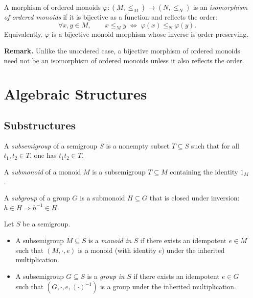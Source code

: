 \begin{definition}
\label{def:ordered-monoid-isomorphism}
A morphism of ordered monoids \(\varphi:(M,\le_M)\to (N,\le_N)\) is an \emph{isomorphism of ordered monoids} if it is bijective as a function and reflects the order:
\[
\forall x,y\in M,\qquad x\le_M y \;\Longleftrightarrow\; \varphi(x)\le_N \varphi(y).
\]
Equivalently, \(\varphi\) is a bijective monoid morphism whose inverse is order-preserving.
\end{definition}

\noindent\textbf{Remark.}
Unlike the unordered case, a bijective morphism of ordered monoids need not be an isomorphism of ordered monoids unless it also reflects the order.

\chapter {Algebraic Structures}

\section{Substructures}

\begin{definition}[Subsemigroup]
\label{def:subsemigroup}
A \emph{subsemigroup} of a semigroup \(S\) is a nonempty subset \(T\subseteq S\) such that for all \(t_1,t_2\in T\), one has \(t_1t_2\in T\).
\end{definition}

\begin{definition}
\label{def:submonoid}
A \emph{submonoid} of a monoid \(M\) is a subsemigroup \(T\subseteq M\) containing the identity \(1_M\).
\end{definition}

\begin{definition}
\label{def:subgroup}
A \emph{subgroup} of a group \(G\) is a submonoid \(H\subseteq G\) that is closed under inversion: \(h\in H\Rightarrow h^{-1}\in H\).
\end{definition}

\begin{definition}
\label{def:internal-monoid-group}
Let \(S\) be a semigroup.
\begin{itemize}
  \item A subsemigroup \(M\subseteq S\) is a \emph{monoid in \(S\)} if there exists an idempotent \(e\in M\) such that \((M,\cdot,e)\) is a monoid (with identity \(e\)) under the inherited multiplication.
  \item A subsemigroup \(G\subseteq S\) is a \emph{group in \(S\)} if there exists an idempotent \(e\in G\) such that \((G,\cdot,e,(\cdot)^{-1})\) is a group under the inherited multiplication.
\end{itemize}
\end{definition}

